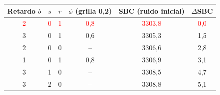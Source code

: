 \begin{tabular}{cccccc}
\toprule
Retardo $b$ & $s$ & $r$ & $\phi$ (grilla 0,2) & SBC (ruido inicial) & $\Delta$SBC
\\ \midrule
\textcolor{red}{2} & \textcolor{red}{0} & \textcolor{red}{1} & \textcolor{red}{0{,}8} & \textcolor{red}{3303{,}8} & \textcolor{red}{0{,}0} \\
3 & 0 & 1 & 0{,}6 & 3305{,}3 & 1{,}5 \\
2 & 0 & 0 & -- & 3306{,}6 & 2{,}8 \\
1 & 0 & 1 & 0{,}8 & 3306{,}9 & 3{,}1 \\
3 & 1 & 0 & -- & 3308{,}5 & 4{,}7 \\
3 & 2 & 0 & -- & 3308{,}8 & 5{,}1 \\
\bottomrule
\end{tabular}

